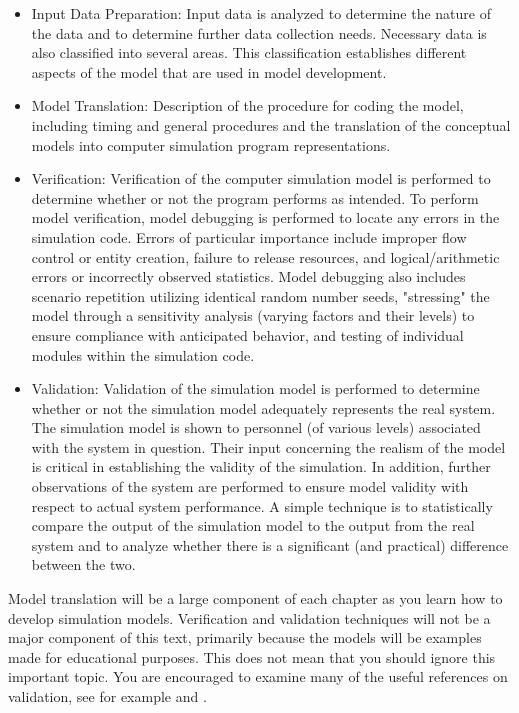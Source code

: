 \documentclass[
]{book}
\theoremstyle{definition}
\theoremstyle{definition}
\theoremstyle{definition}
\theoremstyle{definition}
\theoremstyle{remark}
\begin{document}
\begin{itemize}
\item
  Input Data Preparation: Input data is analyzed to determine the
  nature of the data and to determine further data collection needs.
  Necessary data is also classified into several areas. This
  classification establishes different aspects of the model that are
  used in model development.
\item
  Model Translation: Description of the procedure for coding the
  model, including timing and general procedures and the translation
  of the conceptual models into computer simulation program
  representations.
\item
  Verification: Verification of the computer simulation model is
  performed to determine whether or not the program performs as
  intended. To perform model verification, model debugging is
  performed to locate any errors in the simulation code. Errors of
  particular importance include improper flow control or entity
  creation, failure to release resources, and logical/arithmetic
  errors or incorrectly observed statistics. Model debugging also
  includes scenario repetition utilizing identical random number
  seeds, "stressing" the model through a sensitivity analysis
  (varying factors and their levels) to ensure compliance with
  anticipated behavior, and testing of individual modules within the
  simulation code.
\item
  Validation: Validation of the simulation model is performed to
  determine whether or not the simulation model adequately represents
  the real system. The simulation model is shown to personnel (of
  various levels) associated with the system in question. Their input
  concerning the realism of the model is critical in establishing the
  validity of the simulation. In addition, further observations of the
  system are performed to ensure model validity with respect to actual
  system performance. A simple technique is to statistically compare
  the output of the simulation model to the output from the real
  system and to analyze whether there is a significant (and practical)
  difference between the two.
\end{itemize}

Model translation will be a large component of each chapter as you learn
how to develop simulation models. Verification and validation techniques
will not be a major component of this text, primarily because the models
will be examples made for educational purposes. This does not mean that
you should ignore this important topic. You are encouraged to examine
many of the useful references on validation, see for example
\citep{balci1997principles} and \citep{balci1998verification}.
\end{document}
